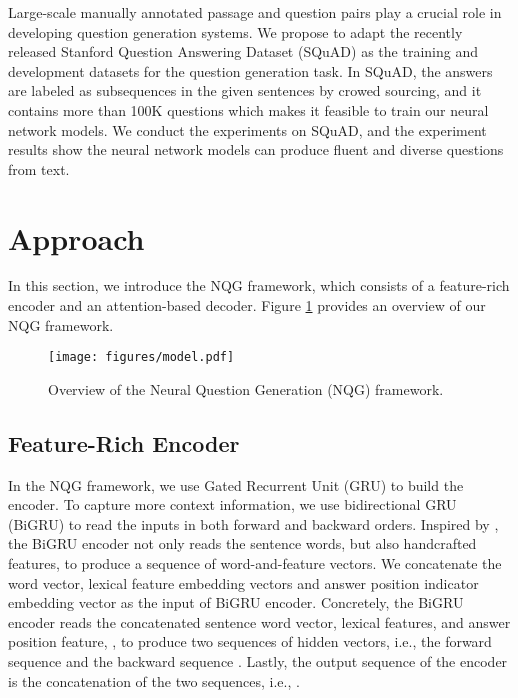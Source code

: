 \documentclass[11pt,letterpaper]{article}
\newcommand{\ourModelName}{NQG}
\begin{document}
Large-scale manually annotated passage and question pairs play a crucial role in developing question generation systems.
We propose to adapt the recently released Stanford Question Answering Dataset (SQuAD) \citep{rajpurkar2016squad} as the training and development datasets for the question generation task.
In SQuAD, the answers are labeled as subsequences in the given sentences by crowed sourcing, and it contains more than 100K questions which makes it feasible to train our neural network models.
We conduct the experiments on SQuAD, and the experiment results show the neural network models can produce fluent and diverse questions from text.
 

\section{Approach}
In this section, we introduce the \ourModelName{} framework, which consists of a feature-rich encoder and an attention-based decoder.
Figure \ref{fig:model} provides an overview of our \ourModelName{} framework.

\begin{figure}[ht]
	\centering
	\texttt{[image: figures/model.pdf]}
	\caption{\label{fig:model}Overview of the Neural Question Generation (\ourModelName{}) framework.
	}
\end{figure}



\subsection{Feature-Rich Encoder}
In the \ourModelName{} framework, we use Gated Recurrent Unit (GRU) \cite{cho-EtAl:2014:EMNLP2014} to build the encoder.
To capture more context information, we use bidirectional GRU (BiGRU) to read the inputs in both forward and backward orders.
Inspired by \citet{chen-manning:2014:EMNLP2014,nallapatiabstractive}, the BiGRU encoder not only reads the sentence words, but also handcrafted features, to produce a sequence of word-and-feature vectors.
We concatenate the word vector, lexical feature embedding vectors and answer position indicator embedding vector as the input of BiGRU encoder.
Concretely, the BiGRU encoder reads the concatenated sentence word vector, lexical features, and answer position feature, , to produce two sequences of hidden vectors, i.e., the forward sequence  and the backward sequence .
Lastly, the output sequence of the encoder is the concatenation of the two sequences, i.e., .
\end{document}
